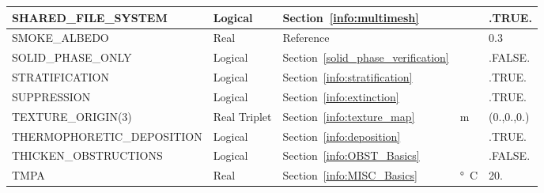 \documentclass[11pt]{book}
\begin{document}
\begin{longtable}{@{\extracolsep{\fill}}|l|l|l|l|l|}
{\ct SHARED\_FILE\_SYSTEM}                      & Logical       & Section~\ref{info:multimesh}                          &               & {\ct .TRUE.}      \\ \hline
{\ct SMOKE\_ALBEDO}                             & Real          & Reference~\cite{Smokeview_Users_Guide}                &               & 0.3               \\ \hline
{\ct SOLID\_PHASE\_ONLY}                        & Logical       & Section~\ref{solid_phase_verification}                &               & {\ct .FALSE.}     \\ \hline
{\ct STRATIFICATION}                            & Logical       & Section~\ref{info:stratification}                     &               & {\ct .TRUE.}      \\ \hline
{\ct SUPPRESSION}                               & Logical       & Section~\ref{info:extinction}                         &               & {\ct .TRUE.}      \\ \hline
{\ct TEXTURE\_ORIGIN(3)}                        & Real Triplet  & Section~\ref{info:texture_map}                        & m             & (0.,0.,0.)        \\ \hline
{\ct THERMOPHORETIC\_DEPOSITION}                & Logical       & Section~\ref{info:deposition}                         &               & {\ct .TRUE.}      \\ \hline
{\ct THICKEN\_OBSTRUCTIONS}                     & Logical       & Section~\ref{info:OBST_Basics}                        &               & {\ct .FALSE.}     \\ \hline
{\ct TMPA}                                      & Real          & Section~\ref{info:MISC_Basics}                        & \si{\degree C} & 20.               \\ \hline

\end{longtable}
\end{document}
